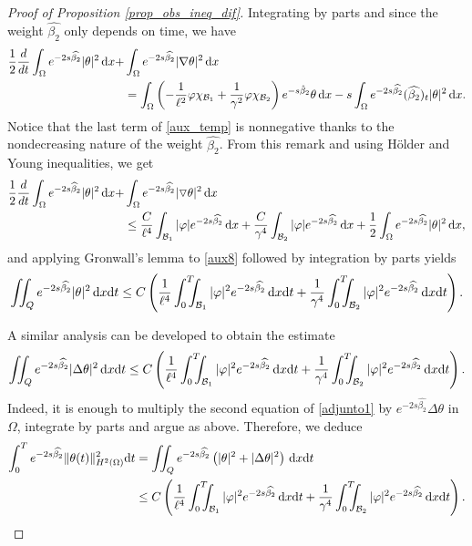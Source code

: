 \documentclass{aims}
\theoremstyle{definition}
\newcommand\csin[1]{\chi_{#1}}
\def\dx{\,\textnormal{d}x}
\def\dt{\textnormal{d}t}
\begin{document}
\begin{proof}[Proof of Proposition \ref{prop_obs_ineq_dif}]
Integrating by parts and since the weight $\widehat{\beta_2}$ only depends on time, we have
%
\begin{equation}
\label{aux_temp}
\begin{split}
\frac12\frac{d}{dt}\int_{\Omega}e^{-2s\widehat{\beta_2}}|\theta|^2\dx+&\int_{\Omega}e^{-2s\widehat{\beta_2}}|\nabla \theta|^2\dx\\
&=\int_{\Omega}\left(-\frac{1}{\ell^2}\varphi\csin{\mathcal B_1}+\frac{1}{\gamma^2}\varphi \csin{\mathcal B_2}\right)e^{-s\hat{\beta}_2}\theta\dx-s\int_{\Omega}e^{-2s\widehat{\beta_2}}(\widehat{\beta_2})_t|\theta|^2\dx.
\end{split}
\end{equation}
%
 Notice that the last term of \eqref{aux_temp} is nonnegative thanks to the nondecreasing nature of the weight $\widehat{\beta_2}$. From this remark and using H\"older and Young inequalities, we get
 \begin{equation}
\label{aux8}
\begin{split}
\frac12\frac{d}{dt}\int_{\Omega}e^{-2s\widehat{\beta}_2}|\theta|^2\dx+&\int_{\Omega}e^{-2s\widehat{\beta_2}}|\triangledown \theta|^2\dx\\
&\leq \frac{C}{\ell^4}\int_{\mathcal B_1}|\varphi|e^{-2s\widehat{\beta_2}}\dx+\frac{C}{\gamma^4}\int_{\mathcal B_2}|\varphi|e^{-2s\widehat{\beta_2}}\dx+\frac12\int_{\Omega}e^{-2s\widehat{\beta_2}}|\theta|^2\dx, 
\end{split}
\end{equation}
and applying Gronwall's lemma to \eqref{aux8} followed by integration by parts yields
 \begin{equation}
\label{aux9}
\iint_Q e^{-2s\widehat{\beta_2}}|\theta|^2\dx\dt\leq C\left(\frac{1}{\ell^4}\int_0^T\!\!\!\!\int_{\mathcal B_1}|\varphi|^2e^{-2s\widehat{\beta_2}}\dx\dt+\frac{1}{\gamma^4}\int_0^T\!\!\!\!\int_{\mathcal B_2}|\varphi|^2e^{-2s\widehat{\beta_2}}\dx\dt\right).
\end{equation}
 
A similar analysis can be developed to obtain the estimate
%
\begin{equation}
\label{aux10}
\iint_{Q} e^{-2s\widehat{\beta_2}}|\Delta\theta|^2\dx\dt\leq C\left(\frac{1}{\ell^4}\int_0^T\!\!\!\!\int_{\mathcal B_1}|\varphi|^2e^{-2s\widehat{\beta_2}}\dx\dt+\frac{1}{\gamma^4}\int_0^T\!\!\!\!\int_{\mathcal B_2}|\varphi|^2e^{-2s\widehat{\beta_2}}\dx\dt\right).
\end{equation}
%
Indeed, it is enough to multiply the second equation of \eqref{adjunto1} by $e^{-2s\widehat{\beta_2}}\Delta\theta$ in $\Omega$, integrate by parts and argue as above. Therefore, we deduce
%
\begin{align}\notag 
\int_{0}^Te^{-2s\widehat{\beta_2}}\|\theta(t)\|_{H^2(\Omega)}^2\dt&=\iint_{Q}e^{-2s\widehat{\beta_2}}\left(|\theta|^2+
|\Delta \theta|^2\right)\dx\dt \\ \label{est_theta_h2}
&\leq C\left(\frac{1}{\ell^4}\int_0^T\!\!\!\!\int_{\mathcal B_1}|\varphi|^2e^{-2s\widehat{\beta_2}}\dx\dt+\frac{1}{\gamma^4}\int_0^T\!\!\!\!\int_{\mathcal B_2}|\varphi|^2e^{-2s\widehat{\beta_2}}\dx\dt\right).
\end{align}
%


\end{proof}
\end{document}
